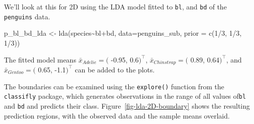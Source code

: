 \documentclass[
  letterpaper,
]{krantz}
\newenvironment{Shaded}{\begin{snugshade}}{\end{snugshade}}
\newcommand{\AttributeTok}[1]{\textcolor[rgb]{0.40,0.45,0.13}{#1}}
\newcommand{\DecValTok}[1]{\textcolor[rgb]{0.68,0.00,0.00}{#1}}
\newcommand{\FunctionTok}[1]{\textcolor[rgb]{0.28,0.35,0.67}{#1}}
\newcommand{\NormalTok}[1]{\textcolor[rgb]{0.00,0.23,0.31}{#1}}
\newcommand{\OtherTok}[1]{\textcolor[rgb]{0.00,0.23,0.31}{#1}}
\newcommand{\SpecialCharTok}[1]{\textcolor[rgb]{0.37,0.37,0.37}{#1}}
\begin{document}
We'll look at this for 2D using the LDA model fitted to \texttt{bl}, and
\texttt{bd} of the \texttt{penguins} data.

\begin{Shaded}
\begin{Highlighting}[]
\NormalTok{p\_bl\_bd\_lda }\OtherTok{\textless{}{-}} \FunctionTok{lda}\NormalTok{(species}\SpecialCharTok{\textasciitilde{}}\NormalTok{bl}\SpecialCharTok{+}\NormalTok{bd, }\AttributeTok{data=}\NormalTok{penguins\_sub, }
                                  \AttributeTok{prior =} \FunctionTok{c}\NormalTok{(}\DecValTok{1}\SpecialCharTok{/}\DecValTok{3}\NormalTok{, }\DecValTok{1}\SpecialCharTok{/}\DecValTok{3}\NormalTok{, }\DecValTok{1}\SpecialCharTok{/}\DecValTok{3}\NormalTok{))}
\end{Highlighting}
\end{Shaded}

The fitted model means \(\bar{x}_{Adelie} = (\) -0.95, 0.6\()^\top\),
\(\bar{x}_{Chinstrap} = (\) 0.89, 0.64\()^\top\), and
\(\bar{x}_{Gentoo} = (\) 0.65, -1.1\()^\top\) can be added to the plots.

The boundaries can be examined using the \texttt{explore()} function
from the \texttt{classifly} package, which generates observations in the
range of all values of\texttt{bl} and \texttt{bd} and predicts their
class. Figure~\ref{fig-lda-2D-boundary} shows the resulting prediction
regions, with the observed data and the sample means overlaid.
\end{document}

